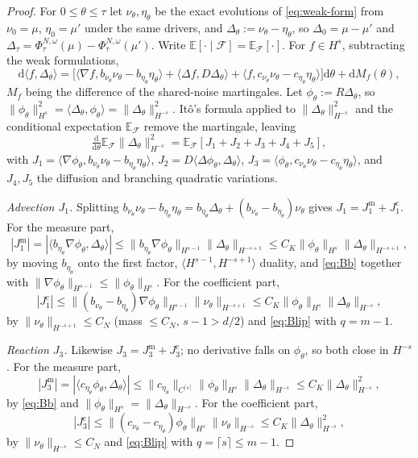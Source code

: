 \documentclass[a4paper,fleqn]{cas-sc}
\theoremstyle{definition}
\theoremstyle{remark}
\begin{document}
\begin{proof}
For $0\le\theta\le\tau$ let $\nu_\theta,\eta_\theta$ be the exact evolutions of
\eqref{eq:weak-form} from $\nu_0=\mu$, $\eta_0=\mu'$ under the same drivers, and
$\Delta_\theta:=\nu_\theta-\eta_\theta$, so $\Delta_0=\mu-\mu'$ and
$\Delta_\tau=\Phi^{N,\omega}_\tau(\mu)-\Phi^{N,\omega}_\tau(\mu')$. Write
$\mathbb E[\cdot\mid\mathcal F]=\mathbb E_{\mathcal F}[\cdot]$. For $f\in H^s$,
subtracting the weak formulations,
\[
\mathrm d\langle f,\Delta_\theta\rangle
=\bigl[\langle\nabla f,b_{\nu_\theta}\nu_\theta-b_{\eta_\theta}\eta_\theta\rangle
+\langle\Delta f,D\Delta_\theta\rangle
+\langle f,c_{\nu_\theta}\nu_\theta-c_{\eta_\theta}\eta_\theta\rangle\bigr]\mathrm d\theta
+\mathrm dM_f(\theta),
\]
$M_f$ being the difference of the shared-noise martingales. Let
$\phi_\theta:=R\Delta_\theta$, so $\|\phi_\theta\|_{H^s}^2
=\langle\Delta_\theta,\phi_\theta\rangle=\|\Delta_\theta\|_{H^{-s}}^2$. It\^o's
formula applied to $\|\Delta_\theta\|_{H^{-s}}^2$ and the conditional expectation
$\mathbb E_{\mathcal F}$ remove the martingale, leaving
\[
\tfrac{\mathrm d}{\mathrm d\theta}\mathbb E_{\mathcal F}\|\Delta_\theta\|_{H^{-s}}^2
=\mathbb E_{\mathcal F}[J_1+J_2+J_3+J_4+J_5],
\]
with $J_1=\langle\nabla\phi_\theta,b_{\nu_\theta}\nu_\theta-b_{\eta_\theta}\eta_\theta\rangle$,
$J_2=D\langle\Delta\phi_\theta,\Delta_\theta\rangle$,
$J_3=\langle\phi_\theta,c_{\nu_\theta}\nu_\theta-c_{\eta_\theta}\eta_\theta\rangle$,
and $J_4,J_5$ the diffusion and branching quadratic variations.

\emph{Advection $J_1$.} Splitting
$b_{\nu_\theta}\nu_\theta-b_{\eta_\theta}\eta_\theta
=b_{\eta_\theta}\Delta_\theta+(b_{\nu_\theta}-b_{\eta_\theta})\nu_\theta$ gives
$J_1=J_1^{\mathrm m}+J_1^{\mathrm c}$. For the measure part,
\[
|J_1^{\mathrm m}|
=|\langle b_{\eta_\theta}\nabla\phi_\theta,\Delta_\theta\rangle|
\le\|b_{\eta_\theta}\nabla\phi_\theta\|_{H^{s-1}}\|\Delta_\theta\|_{H^{-s+1}}
\le C_K\|\phi_\theta\|_{H^s}\|\Delta_\theta\|_{H^{-s+1}},
\]
by moving $b_{\eta_\theta}$ onto the first factor, $\langle H^{s-1},H^{-s+1}\rangle$
duality, and \eqref{eq:Bb} together with
$\|\nabla\phi_\theta\|_{H^{s-1}}\le\|\phi_\theta\|_{H^s}$. For the coefficient part,
\[
|J_1^{\mathrm c}|
\le\|(b_{\nu_\theta}-b_{\eta_\theta})\nabla\phi_\theta\|_{H^{s-1}}\|\nu_\theta\|_{H^{-s+1}}
\le C_K\|\phi_\theta\|_{H^s}\|\Delta_\theta\|_{H^{-s}},
\]
by $\|\nu_\theta\|_{H^{-s+1}}\le C_N$ (mass $\le C_N$, $s-1>d/2$) and
\eqref{eq:Blip} with $q=m-1$.

\emph{Reaction $J_3$.} Likewise $J_3=J_3^{\mathrm m}+J_3^{\mathrm c}$; no
derivative falls on $\phi_\theta$, so both close in $H^{-s}$. For the measure part,
\[
|J_3^{\mathrm m}|
=|\langle c_{\eta_\theta}\phi_\theta,\Delta_\theta\rangle|
\le\|c_{\eta_\theta}\|_{C^{\lceil s\rceil}}\|\phi_\theta\|_{H^s}\|\Delta_\theta\|_{H^{-s}}
\le C_K\|\Delta_\theta\|_{H^{-s}}^2,
\]
by \eqref{eq:Bb} and $\|\phi_\theta\|_{H^s}=\|\Delta_\theta\|_{H^{-s}}$. For the
coefficient part,
\[
|J_3^{\mathrm c}|
\le\|(c_{\nu_\theta}-c_{\eta_\theta})\phi_\theta\|_{H^s}\|\nu_\theta\|_{H^{-s}}
\le C_K\|\Delta_\theta\|_{H^{-s}}^2,
\]
by $\|\nu_\theta\|_{H^{-s}}\le C_N$ and \eqref{eq:Blip} with
$q=\lceil s\rceil\le m-1$.


\end{proof}
\end{document}
